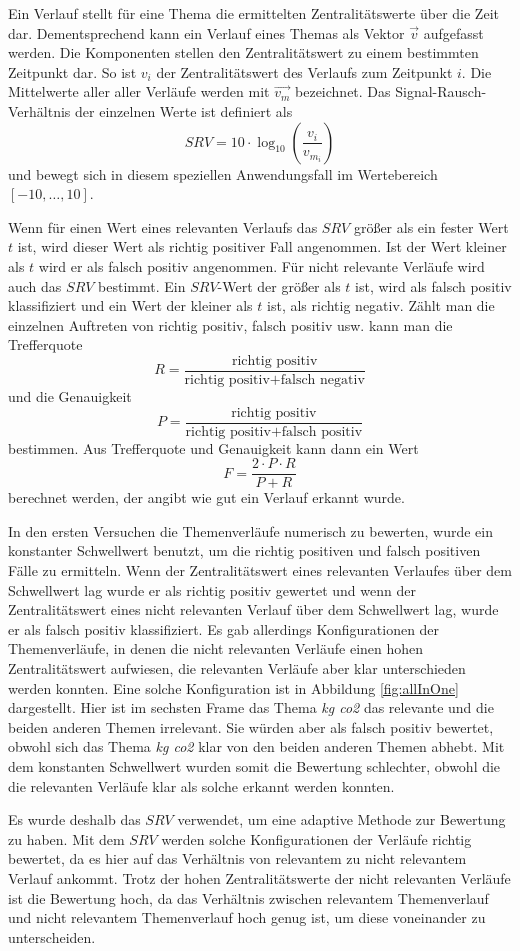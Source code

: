 Ein Verlauf stellt für eine Thema die ermittelten Zentralitätswerte über die Zeit dar. Dementsprechend kann ein Verlauf eines Themas als Vektor $\vec{v}$ aufgefasst werden. Die Komponenten stellen den Zentralitätswert zu einem bestimmten Zeitpunkt dar. So ist $v_i$ der Zentralitätswert des Verlaufs zum Zeitpunkt $i$. Die Mittelwerte aller aller Verläufe werden mit $\vec{v_m}$ bezeichnet. Das Signal-Rausch-Verhältnis der einzelnen Werte ist definiert als
\[
SRV=10 \cdot \log_{10}\left({\frac{v_i}{v_{m_{i}}}}\right)
\]
und bewegt sich in diesem speziellen Anwendungsfall im Wertebereich $[-10,\ldots,10]$.

Wenn für einen Wert eines relevanten Verlaufs das $SRV$ größer als ein fester Wert $t$ ist, wird dieser Wert als richtig positiver Fall angenommen. Ist der Wert kleiner als $t$ wird er als falsch positiv angenommen. Für nicht relevante Verläufe wird auch das $SRV$ bestimmt. Ein $SRV$-Wert der größer als $t$ ist, wird als falsch positiv klassifiziert und ein Wert der kleiner als $t$ ist, als richtig negativ. Zählt man die einzelnen Auftreten von richtig positiv, falsch positiv usw. kann man die Trefferquote \[R = \frac{\text{richtig positiv}}{\text{richtig positiv} + \text{falsch negativ}}\] und die Genauigkeit \[P = \frac{\text{richtig positiv}}{\text{richtig positiv} + \text{falsch positiv}}\] bestimmen. Aus Trefferquote und Genauigkeit kann dann ein Wert \[F=\frac{2 \cdot P \cdot R}{P+R} \] berechnet werden, der angibt wie gut ein Verlauf erkannt wurde.

In den ersten Versuchen die Themenverläufe numerisch zu bewerten, wurde ein konstanter Schwellwert benutzt, um die richtig positiven und falsch positiven Fälle zu ermitteln. Wenn der Zentralitätswert eines relevanten Verlaufes über dem Schwellwert lag wurde er als richtig positiv gewertet und wenn der Zentralitätswert eines nicht relevanten Verlauf über dem Schwellwert lag, wurde er als falsch positiv klassifiziert. Es gab allerdings Konfigurationen der Themenverläufe, in denen die nicht relevanten Verläufe einen hohen Zentralitätswert aufwiesen, die relevanten Verläufe aber klar unterschieden werden konnten. Eine solche Konfiguration ist in Abbildung \ref{fig:allInOne} dargestellt. Hier ist im sechsten Frame das Thema \textit{kg co2} das relevante und die beiden anderen Themen irrelevant. Sie würden aber als falsch positiv bewertet, obwohl sich das Thema \textit{kg co2} klar von den beiden anderen Themen abhebt. Mit dem konstanten Schwellwert wurden somit die Bewertung schlechter, obwohl die die relevanten Verläufe klar als solche erkannt werden konnten. 

Es wurde deshalb das $SRV$ verwendet, um eine adaptive Methode zur Bewertung zu haben. Mit dem $SRV$ werden solche Konfigurationen der Verläufe richtig bewertet, da es hier auf das Verhältnis von relevantem zu nicht relevantem Verlauf ankommt. Trotz der hohen Zentralitätswerte der nicht relevanten Verläufe ist die Bewertung hoch, da das Verhältnis zwischen relevantem Themenverlauf und nicht relevantem Themenverlauf hoch genug ist, um diese voneinander zu unterscheiden.